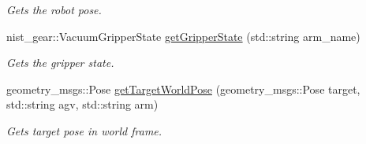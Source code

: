 \begin{DoxyCompactItemize}
\begin{DoxyCompactList}\small\item\em Gets the robot pose. \end{DoxyCompactList}\item 
nist\+\_\+gear\+::\+Vacuum\+Gripper\+State \hyperlink{classGantryControl_a986691834604135cf47b1c070f8d915e}{get\+Gripper\+State} (std\+::string arm\+\_\+name)
\begin{DoxyCompactList}\small\item\em Gets the gripper state. \end{DoxyCompactList}\item 
geometry\+\_\+msgs\+::\+Pose \hyperlink{classGantryControl_ae92c2fdeba302399425c1abafc76f973}{get\+Target\+World\+Pose} (geometry\+\_\+msgs\+::\+Pose target, std\+::string agv, std\+::string arm)
\begin{DoxyCompactList}\small\item\em Gets target pose in world frame. \end{DoxyCompactList}\end{DoxyCompactItemize}
